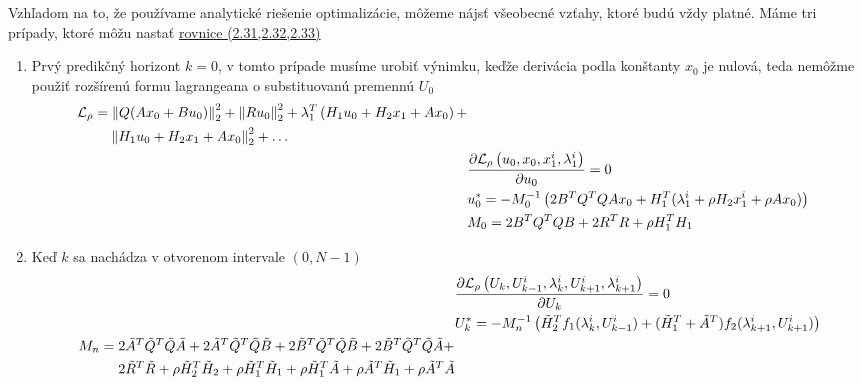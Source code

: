 Vzhľadom na to, že používame analytické riešenie optimalizácie, môžeme nájsť všeobecné vzťahy, ktoré budú vždy platné.
Máme tri prípady, ktoré môžu nastať \hyperref[math:Linear_Lagrangean]{rovnice (2.31,2.32,2.33)}
\begin{enumerate}
	\item{Prvý predikčný horizont $k = 0$, v tomto prípade musíme urobiť výnimku, keďže derivácia podla konštanty $x_0$ je nulová, teda nemôžme použiť rozšírenú formu lagrangeana o substituovanú premennú $U_{0}$\\
		\begin{align}
			\begin{split}
				&\mathcal{L}_{\rho} =\left\lVert Q(Ax_{0}+Bu_{0})\right\rVert^{2}_{2}+\left\lVert Ru_{0}\right\rVert^{2}_{2} +\lambda_{1}^{T}\left(H_{1}u_{0} + H_{2}x_{1} + Ax_{0} \right)+\\&\hspace{0.8cm}\left\lVert H_{1}u_{0} + H_{2}x_{1} + Ax_{0}\right\rVert_{2}^{2}+\dots
			\end{split}\\
			&\frac{\partial \mathcal{L}_{\rho}\left(u_{0},x_{0},x_{1}^{i},\lambda_{1}^{i}\right)}{\partial u_{0}} = 0\\
			&u_{0}^{*} = -M_{0}^{-1}\left(2B^{T}Q^{T}QAx_{0}+H_{1}^{T}(\lambda_{1}^{i}+\rho H_{2}x_{1}^{i}+\rho Ax_{0})\right)\\
			&M_{0} = 2B^{T}Q^{T}QB + 2R^{T}R +\rho H_{1}^{T}H_{1}
		\end{align}
	}
	\item{Keď $k$ sa nachádza v otvorenom intervale $\left(0,N-1\right)$\\
		\begin{align}
			&\frac{\partial \mathcal{L}_{\rho}\left(U_{k},U_{k-1}^{i},\lambda_{k}^{i},U_{k+1}^{i},\lambda_{k+1}^{i}\right)}{\partial U_{k}} = 0\\
			&U_{k}^{*} = -M_{n}^{-1}\left(\tilde{H}_{2}^{T}f_{1}(\lambda_{k}^{i},U_{k-1}^{i})+(\tilde{H}_{1}^{T}+\tilde{A}^{T})f_{2}(\lambda_{k+1}^{i},U_{k+1}^{i})\right)\\
			\begin{split}
				& M_{n} = 2\tilde{A}^{T}\tilde{Q}^{T}\tilde{Q}\tilde{A}+2\tilde{A}^{T}\tilde{Q}^{T}\tilde{Q}\tilde{B}+2\tilde{B}^{T}\tilde{Q}^{T}\tilde{Q}\tilde{B}+2\tilde{B}^{T}\tilde{Q}^{T}\tilde{Q}\tilde{A}+\\
				&\hspace{1.0cm}2\tilde{R}^{T}\tilde{R} + \rho\tilde{H}_{2}^{T}\tilde{H}_{2}+ \rho\tilde{H}_{1}^{T}\tilde{H}_{1} + \rho\tilde{H}_{1}^{T}\tilde{A} + \rho\tilde{A}^{T}\tilde{H}_{1}+ \rho\tilde{A}^{T}\tilde{A}

\end{split}
\end{align}}
\end{enumerate}
